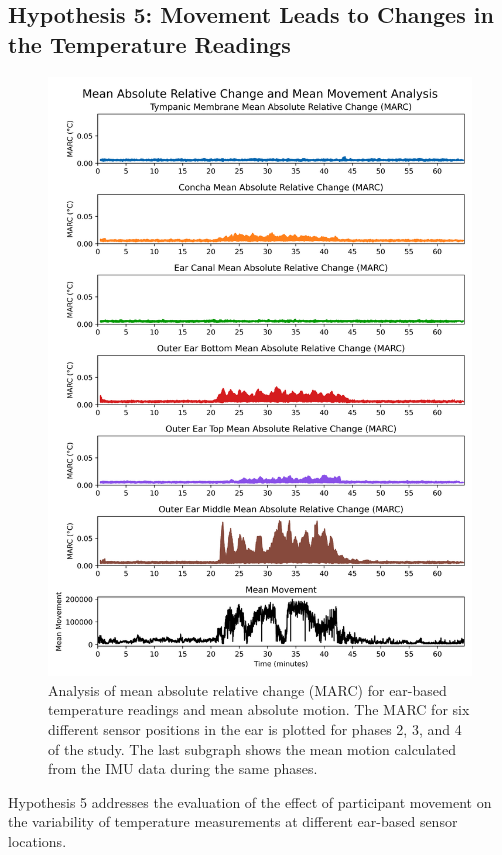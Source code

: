 \subsection{Hypothesis 5: Movement Leads to Changes in the Temperature Readings}
\label{subsec:Evaluation:Study1:Hypothesis5}
\begin{figure}[!t]
    \centering
    \includegraphics[width=\textwidth]{thesis-doc/images/study1/hypothesis5/Hypothesis5_Analysis.png}
    \caption{Analysis of mean absolute relative change (MARC) for ear-based temperature readings and mean absolute motion. The MARC for six different sensor positions in the ear is plotted for phases 2, 3, and 4 of the study. The last subgraph shows the mean motion calculated from the IMU data during the same phases.}    
    \label{fig:eval:study1:hypothesis5_result}
\end{figure} 
Hypothesis 5 addresses the evaluation of the effect of participant movement on the variability of temperature measurements at different ear-based sensor locations.
